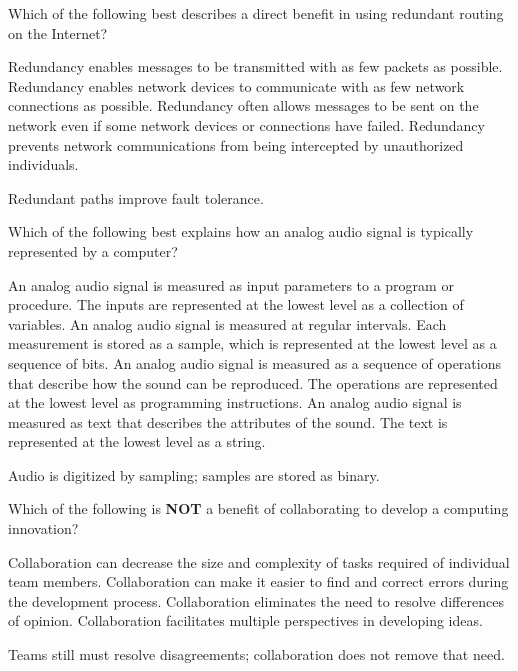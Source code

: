 \question[5]
Which of the following best describes a direct benefit in using redundant routing on the Internet?
\begin{choices}
  \choice Redundancy enables messages to be transmitted with as few packets as possible.
  \choice Redundancy enables network devices to communicate with as few network connections as possible.
  \CorrectChoice Redundancy often allows messages to be sent on the network even if some network devices or connections have failed.
  \choice Redundancy prevents network communications from being intercepted by unauthorized individuals.
\end{choices}
\begin{solution}
  Redundant paths improve fault tolerance.
\end{solution}



\newpage



\question[5]
Which of the following best explains how an analog audio signal is typically represented by a computer?
\begin{choices}
  \choice An analog audio signal is measured as input parameters to a program or procedure. The inputs are represented at the lowest level as a collection of variables.
  \CorrectChoice An analog audio signal is measured at regular intervals. Each measurement is stored as a sample, which is represented at the lowest level as a sequence of bits.
  \choice An analog audio signal is measured as a sequence of operations that describe how the sound can be reproduced. The operations are represented at the lowest level as programming instructions.
  \choice An analog audio signal is measured as text that describes the attributes of the sound. The text is represented at the lowest level as a string.
\end{choices}
\begin{solution}
  Audio is digitized by sampling; samples are stored as binary.
\end{solution}



\question[5]
Which of the following is \textbf{NOT} a benefit of collaborating to develop a computing innovation?
\begin{choices}
  \choice Collaboration can decrease the size and complexity of tasks required of individual team members.
  \choice Collaboration can make it easier to find and correct errors during the development process.
  \CorrectChoice Collaboration eliminates the need to resolve differences of opinion.
  \choice Collaboration facilitates multiple perspectives in developing ideas.
\end{choices}
\begin{solution}
  Teams still must resolve disagreements; collaboration does not remove that need.
\end{solution}

